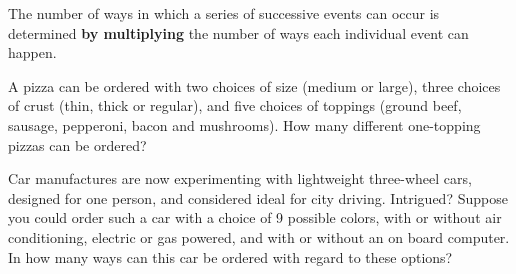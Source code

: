 
\begin{tcolorbox}[enhanced,width=6.5in,center upper,size=fbox,drop shadow southwest,sharp corners]

\begin{tem}  
The number of ways in which a series of successive events can occur is determined {\bf by multiplying} the number of ways each individual event can happen.

\end{tem}
\end{tcolorbox}


\begin{exe} 
A pizza can be ordered with two choices of size (medium or large), three choices of crust (thin, thick or regular), and five choices of toppings (ground beef, sausage, pepperoni, bacon and mushrooms). How many different one-topping pizzas can be ordered?
\end{exe}
\vfill

\begin{exe}\label{4}
Car manufactures are now experimenting with lightweight three-wheel cars, designed for one person, and considered ideal for city driving. Intrigued? Suppose you could order such a car with a choice of 9 possible colors, with or without air conditioning, electric or gas powered, and with or without an on board computer. In how many ways can this car be ordered with regard to these options?
\end{exe}
\vfill

